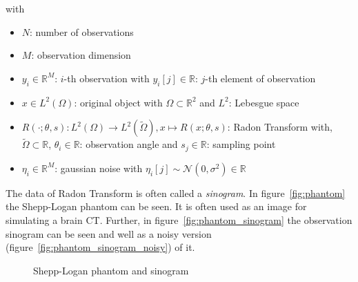 with
\begin{itemize}
    \item $N$: number of observations
    \item $M$: observation dimension
    \item $y_i \in \mathbb{R}^M$:  $i$-th observation with $y_i[j] \in \mathbb{R}$: $j$-th element of observation
    \item $x \in L^2(\Omega)$: original object with $\Omega \subset \mathbb{R}^2 $ and $L^2$: Lebesgue space
    \item $R(\cdot; \theta, s): L^2(\Omega) \to L^2(\tilde{\Omega}) , x \mapsto R(x; \theta,s)$: Radon Transform \cite{radonTransform} with,\\
        $\tilde{\Omega} \subset \mathbb{R}$, $\theta_i \in \mathbb{R}$: observation angle and $s_j \in \mathbb{R}$: sampling point 
    \item $\eta_i \in \mathbb{R}^M$: gaussian noise with $\eta_i[j] \sim \mathcal{N}(0,\sigma^2) \in \mathbb{R}$
\end{itemize}



The data of Radon Transform is often called a \textit{sinogram}.
In figure~\ref{fig:phantom} the Shepp-Logan phantom can be seen. 
It is often used as an image for simulating a brain CT.
Further, in figure~\ref{fig:phantom_sinogram} the observation sinogram can be seen and well as a noisy version (figure~\ref{fig:phantom_sinogram_noisy}) of it.

\begin{figure}[H]
    \label{fig:phantom_and_sinos}
    \centering
    \caption{Shepp-Logan phantom and sinogram}
\end{figure}

